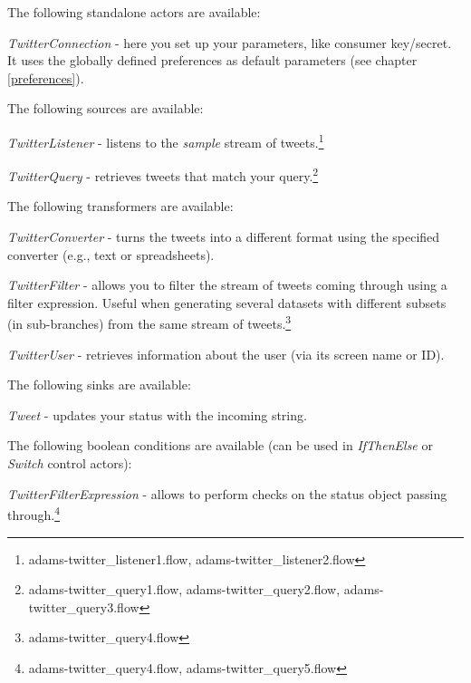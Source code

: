 \documentclass[a4paper]{book}
\begin{document}
\noindent The following standalone actors are available:
\begin{tight_itemize}
	\item \textit{TwitterConnection} - here you set up your parameters, like 
	consumer key/secret. It uses the globally defined preferences as default
	parameters (see chapter \ref{preferences}).
\end{tight_itemize}

\noindent The following sources are available:
\begin{tight_itemize}
	\item \textit{TwitterListener} - listens to the \textit{sample} stream
	of tweets.\footnote{adams-twitter\_listener1.flow, adams-twitter\_listener2.flow}
	\item \textit{TwitterQuery} - retrieves tweets that match your 
	query.\footnote{adams-twitter\_query1.flow, adams-twitter\_query2.flow, adams-twitter\_query3.flow}
\end{tight_itemize}

\noindent The following transformers are available:
\begin{tight_itemize}
	\item \textit{TwitterConverter} - turns the tweets into a different format
	using the specified converter (e.g., text or spreadsheets).
	\item \textit{TwitterFilter} - allows you to filter the stream of tweets
	coming through using a filter expression. Useful when generating several
	datasets with different subsets (in sub-branches) from the same stream 
	of tweets.\footnote{adams-twitter\_query4.flow}
	\item \textit{TwitterUser} - retrieves information about the user (via
	its screen name or ID).
\end{tight_itemize}

\noindent The following sinks are available:
\begin{tight_itemize}
	\item \textit{Tweet} - updates your status with the incoming string.
\end{tight_itemize}

\noindent The following boolean conditions are available (can be used in 
\textit{IfThenElse} or \textit{Switch} control actors):
\begin{tight_itemize}
	\item \textit{TwitterFilterExpression} - allows to perform checks on the 
	status object passing through.\footnote{adams-twitter\_query4.flow, adams-twitter\_query5.flow}
\end{tight_itemize}
\end{document}

